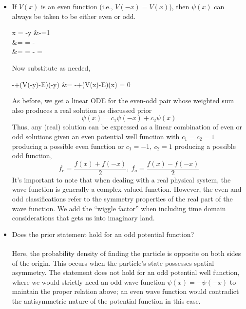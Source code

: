{\begin{itemize}
		\begin{flalign*}
			f(x) = \psi(x)=c_1\psi(x)+c_2\psi^*(x)
		\end{flalign*}
		If $\psi(x)$ did not have any imaginary term(s), then one would pick any real constants to produce a real solution. Hence, if the solutions for the complex conjugate and the conjugate satisfy the time-ind. Schro for real $E, V(x)$, any linear combination of these will also follow suit. 
		Note that $$\psi = \frac{1}{2}((\psi+\psi^*)+i(-i(\psi-\psi^*)))$$ which shows $\psi$ can be written as a linear combination of two real solutions $\psi+\psi^*$ and $i(\psi-\psi^*)$.  Recall that the complex number system extends the real numbers with the imaginary unit $i$ satisfying $i^2=-1$.
		\item If $V(x)$ is an even function (i.e., $V(-x)=V(x)$), then $\psi(x)$ can always be taken to be either even or odd.
		\begin{flalign*}
			x = -y &\implies -\derivative{y}{x}=1\\
			 &= = -\derivative{\psi(-y)}{y}\\
			 &=  = - = \derivative[2]{\psi(-y)}{y}
		\end{flalign*}
		Now substitute as needed,
		\begin{flalign*}
			-+(V(-y)-E)\psi(-y) &= -+(V(x)-E)\psi(x)  = 0\\
		\end{flalign*}
		As before, we get a linear ODE for the even-odd pair whose weighted sum also produces a real solution as discussed prior $$\psi(x)=c_1\psi(-x)+c_2\psi(x)$$ Thus, any (real) solution can be expressed as a linear combination of even or odd solutions given an even potential well function with $c_1 = c_2 = 1$ producing a possible even function or $c_1=-1,~c_2=1$ producing a possible odd function, $$f_e=\frac{f(x)+f(-x)}{2},~f_o=\frac{f(x)-f(-x)}{2}$$
		 It's important to note that when dealing with a real physical system, the wave function is generally a complex-valued function. However, the even and odd classifications refer
		 to the symmetry properties of the real part of the wave function. We add the ``wiggle factor'' when including time domain considerations that gets us into imaginary land.\\
		\item Does the prior statement hold for an odd potential function?\\\\
		Here, the probability density of finding the particle is opposite on both sides of the origin. This occurs when the particle's state possesses spatial asymmetry. The statement does not hold for an odd potential well function, where we would strictly need an odd wave function $\psi(x)=-\psi(-x)$ to maintain the proper relation above; an even wave function would contradict the antisymmetric nature of the potential function in this case.  
	\end{itemize}
}

